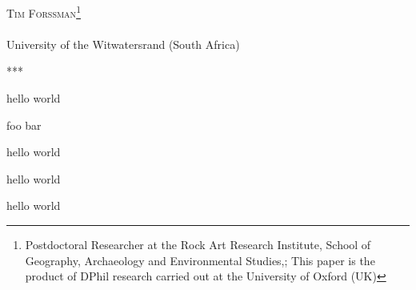 \documentclass[
	year=2016,
	month=October,
	number=1,
	volume=2,
	]{ijsra}
\def\shortauthor{Tim Forssman}
\def\affiliation{University of the Witwatersrand (South Africa)}
\def\thanknote{Postdoctoral Researcher at the Rock Art Research Institute, School of Geography, Archaeology and Environmental Studies,; This paper is the product of DPhil research carried out at the University of Oxford (UK)}
\begin{document}
\IJSRAopening

	{\Large\scshape
	\shortauthor\footnote{\thanknote}}\\[1em]
	\email\\
	\affiliation

\IJSRAmid

\begin{IJSRAabstract}%
***
\end{IJSRAabstract}


hello world
\clearpage

foo bar


hello world
\newpage



hello world
\newpage



hello world
\nocite{*}
\IJSRAclosing
\end{document}
